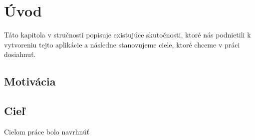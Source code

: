 \chapter{Úvod}
Táto kapitola v stručnosti popisuje existujúce skutočnosti, ktoré nás podnietili k vytvoreniu tejto aplikácie a následne stanovujeme ciele, ktoré chceme v práci dosiahnuť.

\section{Motivácia}



\section{Cieľ}
Cieľom práce bolo navrhnúť